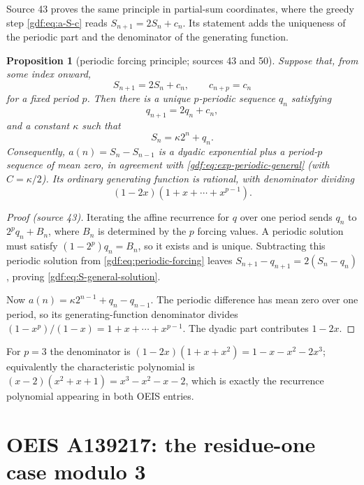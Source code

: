 \documentclass[11pt,a4paper]{article}
\numberwithin{equation}{section}
\newtheorem{proposition}[theorem]{Proposition}
\theoremstyle{definition}
\theoremstyle{remark}
\theoremstyle{plain}
\newcommand{\src}[1]{\textup{(source #1)}}
\begin{document}
Source 43 proves the same principle in partial-sum coordinates, where the
greedy step \eqref{gdf:eq:a-S-c} reads $S_{n+1}=2S_n+c_n$.  Its statement
adds the uniqueness of the periodic part and the denominator of the
generating function.

\begin{proposition}[periodic forcing principle; sources 43 and 50]\label{gdf:prop:forcing}
Suppose that, from some index onward,
\begin{equation}\label{gdf:eq:periodic-forcing}
 S_{n+1}=2S_n+c_n,
 \qquad c_{n+p}=c_n
\end{equation}
for a fixed period $p$.  Then there is a unique $p$-periodic sequence $q_n$
satisfying
\[
 q_{n+1}=2q_n+c_n,
\]
and a constant $\kappa$ such that
\begin{equation}\label{gdf:eq:S-general-solution}
 S_n=\kappa 2^n+q_n.
\end{equation}
Consequently, $a(n)=S_n-S_{n-1}$ is a dyadic exponential plus a period-$p$
sequence of mean zero, in agreement with \eqref{gdf:eq:exp-periodic-general}
(with $C=\kappa/2$).  Its ordinary generating function is rational, with
denominator dividing
\begin{equation}\label{gdf:eq:general-denominator}
 (1-2x)(1+x+\cdots+x^{p-1}).
\end{equation}
\end{proposition}

\begin{proof}[Proof \src{43}]
Iterating the affine recurrence for $q$ over one period sends $q_n$ to
$2^pq_n+B_n$, where $B_n$ is determined by the $p$ forcing values.  A periodic
solution must satisfy $(1-2^p)q_n=B_n$, so it exists and is unique.
Subtracting this periodic solution from \eqref{gdf:eq:periodic-forcing} leaves
$S_{n+1}-q_{n+1}=2(S_n-q_n)$, proving \eqref{gdf:eq:S-general-solution}.

Now $a(n)=\kappa2^{n-1}+q_n-q_{n-1}$.  The periodic difference has mean zero
over one period, so its generating-function denominator divides
$(1-x^p)/(1-x)=1+x+\cdots+x^{p-1}$.  The dyadic part contributes $1-2x$.
\end{proof}

For $p=3$ the denominator is $(1-2x)(1+x+x^2)=1-x-x^2-2x^3$; equivalently the
characteristic polynomial is $(x-2)(x^2+x+1)=x^3-x^2-x-2$, which is exactly
the recurrence polynomial appearing in both OEIS entries.

\section{OEIS A139217: the residue-one case modulo 3}\label{gdf:sec:A139217}
\end{document}
